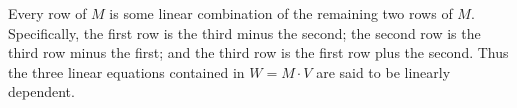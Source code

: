\documentclass{bmcart}
\begin{document}
Every row of $M$ is some linear combination of the remaining two rows of $M$.
Specifically, the first row is the third minus the second;
the second row is the third row minus the first;
and the third row is the first row plus the second.
Thus the three linear equations contained in $W=M\cdot V$
are said to be linearly dependent.

%

%
\end{document}
